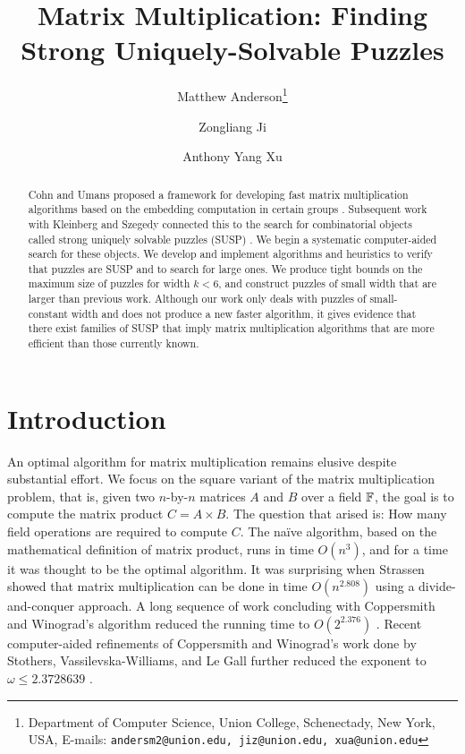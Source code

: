 \documentclass[11pt]{article}
\date{}
\title{Matrix Multiplication: Finding Strong Uniquely-Solvable Puzzles
{\IfFileExists{./sha.tex}{\\\small SHA: }{}}}
\author{
Matthew Anderson\thanks{Department of Computer Science, Union College, Schenectady, New York, USA, E-mails: \texttt{andersm2@union.edu, jiz@union.edu, xua@union.edu}}%
\and%
Zongliang Ji\samethanks[1]
\and%
Anthony Yang Xu\samethanks[1]
}
\begin{document}
\maketitle

\begin{abstract}
Cohn and Umans proposed a framework for developing fast matrix
multiplication algorithms based on the embedding computation in
certain groups \cite{cu03}.  Subsequent work with Kleinberg and
Szegedy connected this to the search for combinatorial objects called
strong uniquely solvable puzzles (SUSP) \cite{cksu05}.  We begin a
systematic computer-aided search for these objects.  We develop and
implement algorithms and heuristics to verify that puzzles are SUSP
and to search for large ones.  We produce tight bounds on the maximum
size of puzzles for width $k < 6$, and construct puzzles of small
width that are larger than previous work.  Although our work only
deals with puzzles of small-constant width and does not produce a new
faster algorithm, it gives evidence that there exist families of SUSP
that imply matrix multiplication algorithms that are more efficient
than those currently known.
\end{abstract}

\thispagestyle{empty}
\newpage
{}


\section{Introduction}
\label{sec:intro}


An optimal algorithm for matrix multiplication remains elusive
despite substantial effort.  We focus on the square variant of the
matrix multiplication problem, that is, given two $n$-by-$n$ matrices
$A$ and $B$ over a field $\F$, the goal is to compute the matrix
product $C = A \times B$.  The question that arised is: How many field
operations are required to compute $C$.  The na\"{i}ve algorithm,
based on the mathematical definition of matrix product, runs in time
$O(n^3)$, and for a time it was thought to be the optimal algorithm.
It was surprising when Strassen showed that matrix multiplication can
be done in time $O(n^{2.808})$ \cite{str69} using a
divide-and-conquer approach.  A long sequence of work concluding with
Coppersmith and Winograd's algorithm reduced the running time
to $O(2^{2.376})$ \cite{pan78,bcrl79,sch81,cw82,str86,cw90}. Recent
computer-aided refinements of Coppersmith and Winograd's work done by
Stothers, Vassilevska-Williams, and Le Gall further reduced the
exponent to $\omega \le 2.3728639$ \cite{ds13,wil12,le14}.
\end{document}
